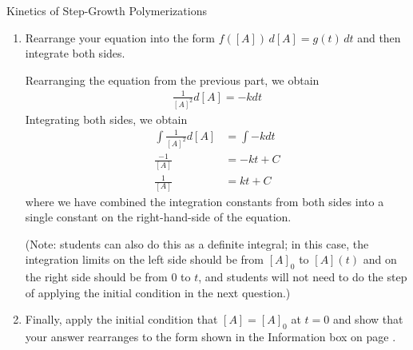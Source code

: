 \begin{activity}{Kinetics of Step-Growth Polymerizations}
\begin{exercises}
\begin{enumerate}
					\begin{solution}{}
						Every reaction uses up one ``A'' and one ``B''.  If the numbers of A's and B's are equal to start, and they change in exactly the same way throughout the reaction, then their concentrations will be equal throughout the entire course of the reaction.
						
						Following this reasoning, we can assume $[A]=[B]$ and substitute $[B]$ with $[A]$ in the expression proposed in CTQ \ref{\labelbase:ctq:proposeratelaw}.  Doing so, we obtain
						\begin{equation*}
							\frac{d[A]}{dt} = -k[A]^2
						\end{equation*}
					\end{solution}
				
				\item Rearrange your equation into the form $f([A])\,d[A] = g(t)\,dt$ and then integrate both sides.
				
					\begin{solution}{}
						Rearranging the equation from the previous part, we obtain
						\begin{align*}
							\frac{1}{[A]^2}d[A] = -k dt
						\end{align*}
						Integrating both sides, we obtain
						\begin{align*}
							\int \frac{1}{[A]^2}d[A] &= \int -k dt \\
							\frac{-1}{[A]} &= -kt + C\\
							\frac{1}{[A]} &= kt + C
						\end{align*}
						where we have combined the integration constants from both sides into a single constant on the right-hand-side of the equation.
						
						(Note: students can also do this as a definite integral; in this case, the integration limits on the left side should be from $[A]_0$ to $[A](t)$ and on the right side should be from $0$ to $t$, and students will not need to do the step of applying the initial condition in the next question.)
					\end{solution}
				
				\item Finally, apply the initial condition that $[A]=[A]_0$ at $t=0$ and show that your answer rearranges to the form shown in the Information box on page \pageref{\labelbase:infobox:catintegrated}.
			\end{enumerate}
				

\end{exercises}
\end{activity}
